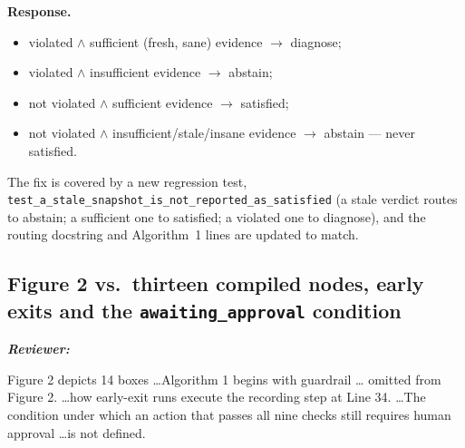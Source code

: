 \documentclass[11pt,a4paper]{article}
\newenvironment{reviewer}{\par\medskip\noindent\begin{minipage}{\linewidth}\small\itshape\color{quote}\textbf{Reviewer:}\par}{\end{minipage}\medskip\par}
\newenvironment{response}{\par\noindent\begin{minipage}{\linewidth}\small\textbf{Response.}\par}{\end{minipage}\medskip\par}
\begin{document}
\begin{response}
\begin{itemize}
  \item violated $\wedge$ sufficient (fresh, sane) evidence $\rightarrow$
    diagnose;
  \item violated $\wedge$ insufficient evidence $\rightarrow$ abstain;
  \item not violated $\wedge$ sufficient evidence $\rightarrow$ satisfied;
  \item not violated $\wedge$ insufficient/stale/insane evidence
    $\rightarrow$ abstain --- never satisfied.
\end{itemize}

The fix is covered by a new regression test,
\texttt{test\_a\_stale\_snapshot\_is\_not\_reported\_as\_satisfied} (a stale
verdict routes to abstain; a sufficient one to satisfied; a violated one to
diagnose), and the routing docstring and Algorithm~1 lines are updated to
match.
\end{response}

\subsection{Figure 2 vs.\ thirteen compiled nodes, early exits and the
\texttt{awaiting\_approval} condition}

\begin{reviewer}
Figure 2 depicts 14 boxes \dots Algorithm 1 begins with guardrail \dots
omitted from Figure 2. \dots how early-exit runs execute the recording
step at Line 34. \dots The condition under which an action that passes all
nine checks still requires human approval \dots is not defined.
\end{reviewer}
\end{document}

